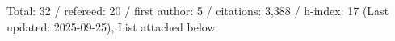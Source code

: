 Total: 32 / refereed: 20 / first author: 5 / citations: 3,388 / h-index: 17 (Last updated: 2025-09-25), List attached below